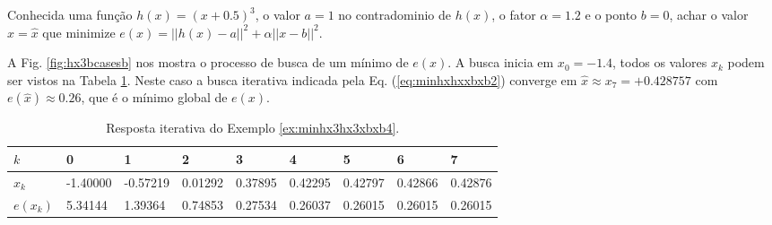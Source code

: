 \begin{example}\label{ex:minhx3hx3xbxb4}
Conhecida uma função $h(x)=(x+0.5)^3$, o valor $a=1$ no contradominio de $h(x)$,
o fator $\alpha=1.2$ e o ponto $b=0$,
achar o valor $x=\hat{x}$ que minimize $e(x)=||h(x)-a||^2+\alpha||x-b||^2$.
\end{example}
\begin{SolutionT}\label{sol:minhx3hx3xbxb4}
 A Fig. \ref{fig:hx3bcasesb} nos mostra o processo de busca de um mínimo
 de $e(x)$. A busca inicia em $x_0=-1.4$,
 todos os valores $x_{k}$ podem ser vistos na Tabela \ref{tab:hx3bcases4}. 
Neste caso a busca iterativa indicada pela Eq. (\ref{eq:minhxhxxbxb2}) converge 
em $\hat{x}\approx x_7=+0.428757$ com $e(\hat{x})\approx 0.26$,
que é o mínimo global de $e(x)$.

\end{SolutionT}


\begin{table}[!h]
\centering
\begin{tabular}{|l|l|l|l|l|l|l|l|l|}
\hline
$k$      & 0 & 1 & 2 & 3 & 4 & 5 & 6 & 7 \\ \hline
$x_k$    & -1.40000 & -0.57219  & 0.01292  & 0.37895  & 0.42295  & 0.42797  & 0.42866  & 0.42876 \\ \hline
$e(x_k)$ &  5.34144 &  1.39364  & 0.74853  & 0.27534  & 0.26037  & 0.26015  & 0.26015  & 0.26015 \\ \hline
\end{tabular}
\caption{Resposta iterativa do Exemplo \ref{ex:minhx3hx3xbxb4}.}
\label{tab:hx3bcases4}
\end{table}


